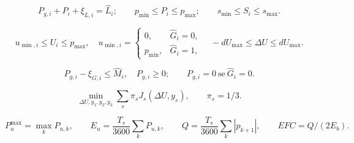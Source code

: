 \begin{equation}
P_{g,i}+P_i+\xi_{L,i}=\widehat L_i;\qquad
p_{\min}\le P_i\le p_{\max};\qquad s_{\min}\le S_i\le s_{\max}.
\end{equation}

\begin{equation}
u_{\min,i}\le U_i\le p_{\max},\quad
u_{\min,i}=\begin{cases}0,&\widehat G_i=0,\\p_{\min},&\widehat G_i=1,\end{cases}\quad
-dU_{\max}\le\Delta U\le dU_{\max}.
\end{equation}

\begin{equation}
P_{g,i}-\xi_{G,i}\le\widehat M_i,\quad P_{g,i}\ge0;\qquad P_{g,i}=0\ \text{se}\ \widehat G_i=0.
\end{equation}

\begin{equation}
\min_{\Delta U,y_1,y_2,y_3}\sum_s\pi_s J_s(\Delta U,y_s),\qquad \pi_s=1/3.
\end{equation}

\begin{equation}
P_u^{\max}=\max_k P_{u,k},\qquad E_u=\frac{T_s}{3600}\sum_k P_{u,k},\qquad
Q=\frac{T_s}{3600}\sum_k|p_{k+1}|,\qquad EFC=Q/(2E_b).
\end{equation}
